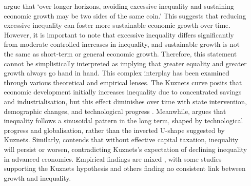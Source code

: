 \textcite{berg2017inequality} argue that `over longer horizons, avoiding excessive inequality and sustaining economic growth may be two sides of the same coin.' This suggests that reducing excessive inequality can foster more sustainable economic growth over time. However, it is important to note that excessive inequality differs significantly from moderate controlled increases in inequality, and sustainable growth is not the same as short-term or general economic growth. Therefore, this statement cannot be simplistically interpreted as implying that greater equality and greater growth always go hand in hand. This complex interplay has been examined through various theoretical and empirical lenses. The Kuznets curve posits that economic development initially increases inequality due to concentrated savings and industrialisation, but this effect diminishes over time with state intervention, demographic changes, and technological progress \parencite{kuznets1955economic}. Meanwhile, \textcite{milanovic2016global} argues that inequality follows a sinusoidal pattern in the long term, shaped by technological progress and globalisation, rather than the inverted U-shape suggested by Kuznets. Similarly, \textcite{piketty2014capital} contends that without effective capital taxation, inequality will persist or worsen, contradicting Kuznets's expectation of declining inequality in advanced economies. Empirical findings are mixed \parencite{martinez2020inequality}, with some studies supporting the Kuznets hypothesis and others finding no consistent link between growth and inequality.

